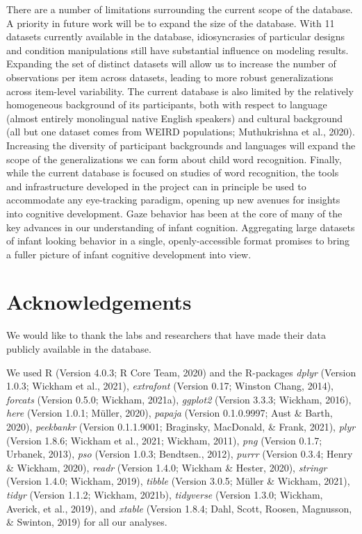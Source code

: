 \documentclass[
  english,
  man,floatsintext]{apa6}
\begin{document}
There are a number of limitations surrounding the current scope of the database. A priority in future work will be to expand the size of the database. With 11 datasets currently available in the database, idiosyncrasies of particular designs and condition manipulations still have substantial influence on modeling results. Expanding the set of distinct datasets will allow us to increase the number of observations per item across datasets, leading to more robust generalizations across item-level variability. The current database is also limited by the relatively homogeneous background of its participants, both with respect to language (almost entirely monolingual native English speakers) and cultural background (all but one dataset comes from WEIRD populations; Muthukrishna et al., 2020). Increasing the diversity of participant backgrounds and languages will expand the scope of the generalizations we can form about child word recognition.
Finally, while the current database is focused on studies of word recognition, the tools and infrastructure developed in the project can in principle be used to accommodate any eye-tracking paradigm, opening up new avenues for insights into cognitive development. Gaze behavior has been at the core of many of the key advances in our understanding of infant cognition. Aggregating large datasets of infant looking behavior in a single, openly-accessible format promises to bring a fuller picture of infant cognitive development into view.

\hypertarget{acknowledgements}{%
\section{Acknowledgements}\label{acknowledgements}}

We would like to thank the labs and researchers that have made their data publicly available in the database.

We used R (Version 4.0.3; R Core Team, 2020) and the R-packages \emph{dplyr} (Version 1.0.3; Wickham et al., 2021), \emph{extrafont} (Version 0.17; Winston Chang, 2014), \emph{forcats} (Version 0.5.0; Wickham, 2021a), \emph{ggplot2} (Version 3.3.3; Wickham, 2016), \emph{here} (Version 1.0.1; Müller, 2020), \emph{papaja} (Version 0.1.0.9997; Aust \& Barth, 2020), \emph{peekbankr} (Version 0.1.1.9001; Braginsky, MacDonald, \& Frank, 2021), \emph{plyr} (Version 1.8.6; Wickham et al., 2021; Wickham, 2011), \emph{png} (Version 0.1.7; Urbanek, 2013), \emph{pso} (Version 1.0.3; Bendtsen., 2012), \emph{purrr} (Version 0.3.4; Henry \& Wickham, 2020), \emph{readr} (Version 1.4.0; Wickham \& Hester, 2020), \emph{stringr} (Version 1.4.0; Wickham, 2019), \emph{tibble} (Version 3.0.5; Müller \& Wickham, 2021), \emph{tidyr} (Version 1.1.2; Wickham, 2021b), \emph{tidyverse} (Version 1.3.0; Wickham, Averick, et al., 2019), and \emph{xtable} (Version 1.8.4; Dahl, Scott, Roosen, Magnusson, \& Swinton, 2019) for all our analyses.
\end{document}
